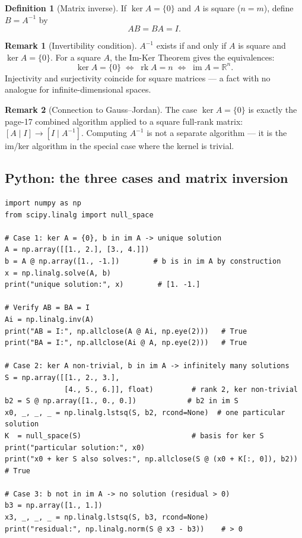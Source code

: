 \documentclass[11pt]{article}
\theoremstyle{definition}
\newtheorem{definition}{Definition}[section]
\newtheorem{remark}{Remark}[section]
\theoremstyle{plain}
\begin{document}
\begin{definition}[Matrix inverse]
  If $\ker A = \{0\}$ and $A$ is square ($n = m$), define $B = A^{-1}$ by
  \[
    AB = BA = I.
  \]
\end{definition}

\begin{remark}[Invertibility condition]
  $A^{-1}$ exists if and only if $A$ is square and $\ker A = \{0\}$.
  For a square $A$, the Im-Ker Theorem gives the equivalences:
  \[
    \ker A = \{0\}
    \;\Longleftrightarrow\;
    \operatorname{rk}A = n
    \;\Longleftrightarrow\;
    \operatorname{im}A = \mathbb{R}^n.
  \]
  Injectivity and surjectivity coincide for square matrices --- a fact
  with no analogue for infinite-dimensional spaces.
\end{remark}

\begin{remark}[Connection to Gauss--Jordan]
  The case $\ker A = \{0\}$ is exactly the page-17 combined algorithm
  applied to a square full-rank matrix: $[A \mid I] \to [I \mid A^{-1}]$.
  Computing $A^{-1}$ is not a separate algorithm --- it is the im/ker
  algorithm in the special case where the kernel is trivial.
\end{remark}

\subsection{Python: the three cases and matrix inversion}
\begin{lstlisting}
import numpy as np
from scipy.linalg import null_space

# Case 1: ker A = {0}, b in im A -> unique solution
A = np.array([[1., 2.], [3., 4.]])
b = A @ np.array([1., -1.])        # b is in im A by construction
x = np.linalg.solve(A, b)
print("unique solution:", x)        # [1. -1.]

# Verify AB = BA = I
Ai = np.linalg.inv(A)
print("AB = I:", np.allclose(A @ Ai, np.eye(2)))   # True
print("BA = I:", np.allclose(Ai @ A, np.eye(2)))   # True

# Case 2: ker A non-trivial, b in im A -> infinitely many solutions
S = np.array([[1., 2., 3.],
              [4., 5., 6.]], float)         # rank 2, ker non-trivial
b2 = S @ np.array([1., 0., 0.])            # b2 in im S
x0, _, _, _ = np.linalg.lstsq(S, b2, rcond=None)  # one particular solution
K  = null_space(S)                          # basis for ker S
print("particular solution:", x0)
print("x0 + ker S also solves:", np.allclose(S @ (x0 + K[:, 0]), b2))  # True

# Case 3: b not in im A -> no solution (residual > 0)
b3 = np.array([1., 1.])
x3, _, _, _ = np.linalg.lstsq(S, b3, rcond=None)
print("residual:", np.linalg.norm(S @ x3 - b3))    # > 0
\end{lstlisting}
\end{document}
